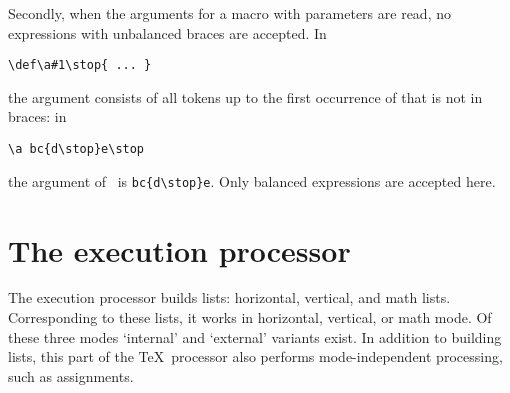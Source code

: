 \documentclass{book}
\begin{document}
Secondly, when the arguments for a macro with
parameters are read, no expressions with unbalanced braces
are accepted. In 
\begin{verbatim}
\def\a#1\stop{ ... }
\end{verbatim}
the argument consists of all
tokens up to the first occurrence of 
that is not in braces: in
\begin{verbatim}
\a bc{d\stop}e\stop
\end{verbatim}
the argument of~ is \verb>bc{d\stop}e>.
Only balanced expressions
are accepted here.

\section{The execution processor}

The execution processor builds lists: horizontal, vertical,
and math lists. Corresponding to these lists, it works
in horizontal, vertical, or math mode. Of these three modes
`internal' and `external' variants exist.
In addition to building lists, this part of the \TeX\ processor
also performs mode-independent processing, such as
assignments.
\end{document}
